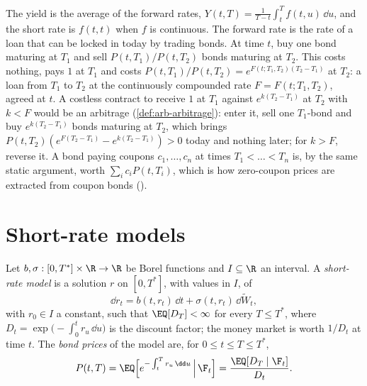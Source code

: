 The yield is the average of the forward rates, $Y(t,T)=\frac1{T-t}\int_t^Tf(t,u)\,\dd u$, and
the short rate is $f(t,t)$ when $f$ is continuous. The forward rate is the rate of a loan that
can be locked in today by trading bonds. At time $t$, buy one bond maturing at $T_1$ and sell
$P(t,T_1)/P(t,T_2)$ bonds maturing at $T_2$. This costs nothing, pays $1$ at $T_1$ and costs
$P(t,T_1)/P(t,T_2)=e^{F(t;T_1,T_2)(T_2-T_1)}$ at $T_2$: a loan from $T_1$ to $T_2$ at the
continuously compounded rate $F=F(t;T_1,T_2)$, agreed at $t$. A costless contract to receive $1$ at
$T_1$ against $e^{k(T_2-T_1)}$ at $T_2$ with $k<F$ would be an arbitrage (\cref{def:arb-arbitrage}):
enter it, sell one $T_1$-bond and buy $e^{k(T_2-T_1)}$ bonds maturing at $T_2$, which brings
$P(t,T_2)(e^{F(T_2-T_1)}-e^{k(T_2-T_1)})>0$ today and nothing later; for $k>F$, reverse it. A bond paying
coupons $c_1,\dots,c_n$ at times $T_1<\dots<T_n$ is, by the same static argument, worth
$\sum_ic_iP(t,T_i)$, which is how zero-coupon prices are extracted from coupon bonds
().

\section{Short-rate models}\label{sec:ir-short-rate}

\begin{definition}\label{def:ir-short-rate}
Let $b,\sigma:[0,T^*]\times\R\to\R$ be Borel functions and $I\subseteq\R$ an interval. A
\emph{short-rate model} is a solution $r$ on $[0,T^*]$, with values in $I$, of
\begin{equation}\label{eq:ir-sde}
  \dd r_t=b(t,r_t)\,\dd t+\sigma(t,r_t)\,\dd\widetilde W_t ,
\end{equation}
with $r_0\in I$ a constant, such that $\EQ[D_T]<\infty$ for every $T\le T^*$, where
$D_t=\exp\big(-\int_0^tr_u\,\dd u\big)$ is the discount factor; the money market is worth $1/D_t$
at time $t$. The \emph{bond prices} of the model are, for $0\le t\le T\le T^*$,
\begin{equation}\label{eq:ir-bond}
  P(t,T)=\EQ\Big[e^{-\int_t^Tr_u\,\dd u}\,\Big|\,\F_t\Big]=\frac{\EQ[D_T\mid\F_t]}{D_t}.
\end{equation}
\end{definition}

